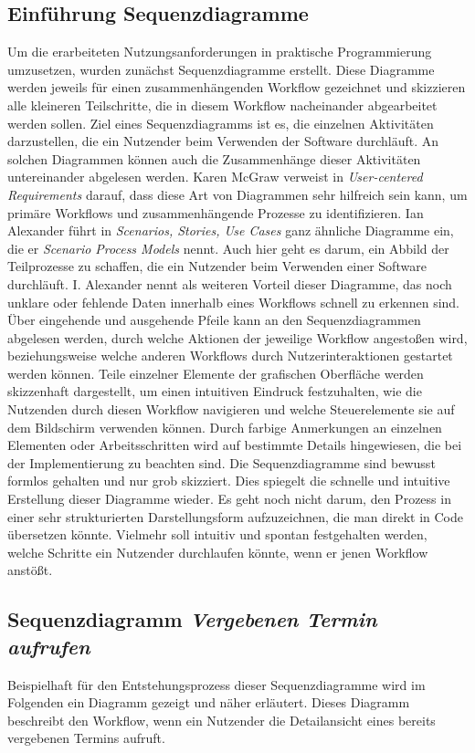 \subsection*{Einführung Sequenzdiagramme}
Um die erarbeiteten Nutzungsanforderungen in praktische Programmierung
umzusetzen, wurden zunächst Sequenzdiagramme erstellt. Diese Diagramme werden
jeweils für einen zusammenhängenden Workflow gezeichnet und skizzieren alle
kleineren Teilschritte, die in diesem Workflow nacheinander abgearbeitet werden
sollen. Ziel eines Sequenzdiagramms ist es, die einzelnen Aktivitäten
darzustellen, die ein Nutzender beim Verwenden der Software
durchläuft\cite{holtzblattCDEvolved}. An solchen Diagrammen können auch die
Zusammenhänge dieser Aktivitäten untereinander abgelesen werden. Karen McGraw
verweist in \textit{User-centered Requirements} darauf, dass diese Art von
Diagrammen sehr hilfreich sein kann, um primäre Workflows und zusammenhängende
Prozesse zu identifizieren\cite{sequenceDiagrams}. Ian Alexander führt in
\textit{Scenarios, Stories, Use Cases} ganz ähnliche Diagramme ein, die er
\textit{Scenario Process Models} nennt. Auch hier geht es darum, ein Abbild der
Teilprozesse zu schaffen, die ein Nutzender beim Verwenden einer Software
durchläuft. I. Alexander nennt als weiteren Vorteil dieser Diagramme, das noch
unklare oder fehlende Daten innerhalb eines Workflows schnell zu erkennen sind.
Über eingehende und ausgehende Pfeile kann an den Sequenzdiagrammen abgelesen
werden, durch welche Aktionen der jeweilige Workflow angestoßen wird,
beziehungsweise welche anderen Workflows durch Nutzerinteraktionen gestartet
werden können. Teile einzelner Elemente der grafischen Oberfläche werden
skizzenhaft dargestellt, um einen intuitiven Eindruck festzuhalten, wie die
Nutzenden durch diesen Workflow navigieren und welche Steuerelemente sie auf
dem Bildschirm verwenden können. Durch farbige Anmerkungen an einzelnen
Elementen oder Arbeitsschritten wird auf bestimmte Details hingewiesen, die bei
der Implementierung zu beachten sind. Die Sequenzdiagramme sind bewusst formlos
gehalten und nur grob skizziert. Dies spiegelt die schnelle und intuitive
Erstellung dieser Diagramme wieder. Es geht noch nicht darum, den Prozess in
einer sehr strukturierten Darstellungsform aufzuzeichnen, die man direkt in
Code übersetzen könnte. Vielmehr soll intuitiv und spontan festgehalten werden,
welche Schritte ein Nutzender durchlaufen könnte, wenn er jenen Workflow
anstößt.

\subsection*{Sequenzdiagramm \textit{Vergebenen Termin aufrufen}}
Beispielhaft für den Entstehungsprozess dieser Sequenzdiagramme wird im
Folgenden ein Diagramm gezeigt und näher erläutert. Dieses Diagramm beschreibt
den Workflow, wenn ein Nutzender die Detailansicht eines bereits vergebenen
Termins aufruft.

